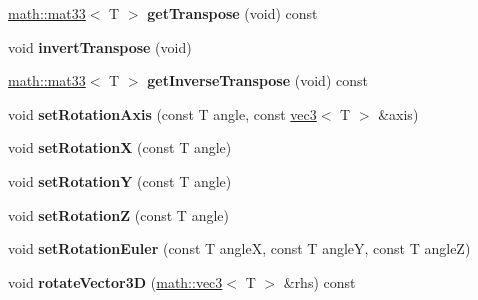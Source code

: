 \begin{DoxyCompactItemize}
\item 
\hypertarget{classmath_1_1mat33_ac1317114d3719757e234616986c9eecf}{
\hyperlink{classmath_1_1mat33}{math::mat33}$<$ T $>$ {\bfseries getTranspose} (void) const }
\label{classmath_1_1mat33_ac1317114d3719757e234616986c9eecf}

\item 
\hypertarget{classmath_1_1mat33_ae2a0de13e9b6e61892d6d4f5d0db90d6}{
void {\bfseries invertTranspose} (void)}
\label{classmath_1_1mat33_ae2a0de13e9b6e61892d6d4f5d0db90d6}

\item 
\hypertarget{classmath_1_1mat33_a314e156440bf0db6dc26192f0059992a}{
\hyperlink{classmath_1_1mat33}{math::mat33}$<$ T $>$ {\bfseries getInverseTranspose} (void) const }
\label{classmath_1_1mat33_a314e156440bf0db6dc26192f0059992a}

\item 
\hypertarget{classmath_1_1mat33_ac4f9f3ede459490b1c44a35abab4a54f}{
void {\bfseries setRotationAxis} (const T angle, const \hyperlink{classmath_1_1vec3}{vec3}$<$ T $>$ \&axis)}
\label{classmath_1_1mat33_ac4f9f3ede459490b1c44a35abab4a54f}

\item 
\hypertarget{classmath_1_1mat33_ad90a375f88206f2aa1571703a5b2adc8}{
void {\bfseries setRotationX} (const T angle)}
\label{classmath_1_1mat33_ad90a375f88206f2aa1571703a5b2adc8}

\item 
\hypertarget{classmath_1_1mat33_aa586fc1b0b2e6c0310a92a181799830d}{
void {\bfseries setRotationY} (const T angle)}
\label{classmath_1_1mat33_aa586fc1b0b2e6c0310a92a181799830d}

\item 
\hypertarget{classmath_1_1mat33_a41c805f2e577826071e5cb95ebe6b8c7}{
void {\bfseries setRotationZ} (const T angle)}
\label{classmath_1_1mat33_a41c805f2e577826071e5cb95ebe6b8c7}

\item 
\hypertarget{classmath_1_1mat33_aee554b3afc31de39404cede72b659e75}{
void {\bfseries setRotationEuler} (const T angleX, const T angleY, const T angleZ)}
\label{classmath_1_1mat33_aee554b3afc31de39404cede72b659e75}

\item 
\hypertarget{classmath_1_1mat33_af4e344f4a07bc0eb5c003cef663e9cc2}{
void {\bfseries rotateVector3D} (\hyperlink{classmath_1_1vec3}{math::vec3}$<$ T $>$ \&rhs) const }
\label{classmath_1_1mat33_af4e344f4a07bc0eb5c003cef663e9cc2}


\end{DoxyCompactItemize}
